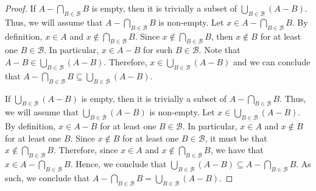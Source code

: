 \documentclass[12pt]{article}
\begin{document}
\begin{enumerate}[label=(\alph*)]
\begin{proof}
		If $A - \bigcap_{B \in \mathcal{B}} B$ is empty, then it is trivially a subset
		of $\bigcup_{B \in \mathcal{B}} (A - B)$. Thus, we will assume that 
		$A - \bigcap_{B \in \mathcal{B}} B$ is non-empty. Let 
		$x \in A - \bigcap_{B \in \mathcal{B}} B$. By definition, $x \in A$
		and $x \notin \bigcap_{B \in \mathcal{B}} B$. Since 
		$x \notin \bigcap_{B \in \mathcal{B}} B$, then $x \notin B$ for at least one 
		$B \in \mathcal{B}$. In particular, $x \in A - B$ for such $B \in \mathcal{B}$.
		Note that $A - B \in \bigcup_{B \in \mathcal{B}} (A - B)$. Therefore,
		$x \in \bigcup_{B \in \mathcal{B}} (A - B)$ and we can conclude that 
		$A - \bigcap_{B \in \mathcal{B}} B \subseteq \bigcup_{B \in \mathcal{B}} (A - B)$.
		
		If $\bigcup_{B \in \mathcal{B}} (A - B)$ is empty, then it is trivially a subset
		of $A - \bigcap_{B \in \mathcal{B}} B$. Thus, we will assume that 
		$\bigcup_{B \in \mathcal{B}} (A - B)$ is non-empty. Let 
		$x \in \bigcup_{B \in \mathcal{B}} (A - B)$. By definition, $x \in A - B$
		for at least one $B \in \mathcal{B}$. In particular, $x \in A$ and 
		$x \notin B$ for at least one $B$. Since $x \notin B$ for at least one 
		$B \in \mathcal{B}$, it must be that $x \notin \bigcap_{B \in \mathcal{B}} B$.
		Therefore, since $x \in A$ and $x \notin \bigcap_{B \in \mathcal{B}} B$,
		we have that $x \in A - \bigcap_{B \in \mathcal{B}} B$. Hence, we conclude
		that $\bigcup_{B \in \mathcal{B}} (A - B) \subseteq A - \bigcap_{B \in \mathcal{B}} B$.
		As such, we conclude that $A - \bigcap_{B \in \mathcal{B}} B = 
		\bigcup_{B \in \mathcal{B}} (A - B)$.
	\end{proof}
\end{enumerate}
\end{document}
